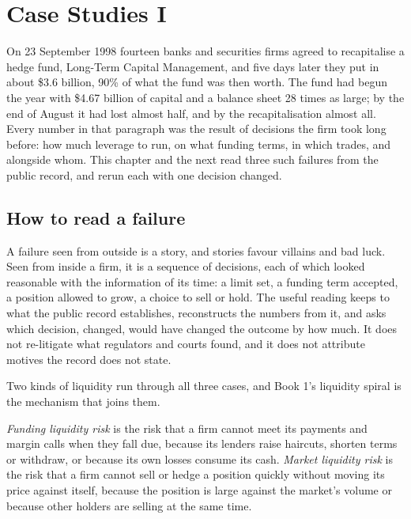 \chapter{Case Studies I}\label{ch:fm:case-studies-i}

On 23 September 1998 fourteen banks and securities firms agreed to recapitalise a hedge fund, Long-Term Capital Management, and five days later
they put in about \$3.6 billion, 90\% of what the fund was then worth. The fund had begun the year with \$4.67 billion of capital and a balance
sheet 28 times as large; by the end of August it had lost almost half, and by the recapitalisation almost all. Every number in that paragraph was
the result of decisions the firm took long before: how much leverage to run, on what funding terms, in which trades, and alongside whom. This chapter
and the next read three such failures from the public record, and rerun each with one decision changed.

\section{How to read a failure}

A failure seen from outside is a story, and stories favour villains and bad luck. Seen from inside a firm, it is a sequence of decisions, each of
which looked reasonable with the information of its time: a limit set, a funding term accepted, a position allowed to grow, a choice to sell or
hold. The useful reading keeps to what the public record establishes, reconstructs the numbers from it, and asks which decision, changed, would
have changed the outcome by how much. It does not re-litigate what regulators and courts found, and it does not attribute motives the record does
not state.

Two kinds of liquidity run through all three cases, and Book 1's liquidity spiral is the mechanism that joins them.

\begin{definition}\label{def:fm:case-studies-i:liquidity}
\emph{Funding liquidity risk} is the risk that a firm cannot meet its payments and margin calls when they fall due,
because its lenders raise haircuts, shorten terms or withdraw, or because its own losses consume its cash. \emph{Market liquidity
risk} is the risk that a firm cannot sell or hedge a position quickly without moving its price against itself, because
the position is large against the market's volume or because other holders are selling at the same time.
\end{definition}

